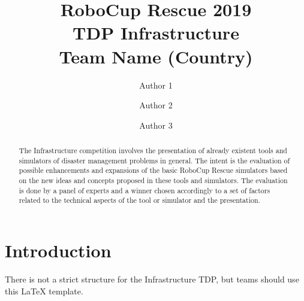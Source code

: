\documentclass[runningheads,a4paper]{llncs}
\begin{document}
\title{RoboCup Rescue 2019\\
       TDP Infrastructure\\
       Team Name (Country)}
\author{Author 1 \and Author 2 \and Author 3}
\maketitle
\begin{abstract}
The Infrastructure competition involves the presentation of already existent tools and simulators of disaster management problems in general. The intent is the evaluation of possible enhancements and expansions of the basic RoboCup Rescue simulators based on the new ideas and concepts proposed in these tools and simulators. The evaluation is done by a panel of experts and a winner chosen accordingly to a set of factors related to the technical aspects of the tool or simulator and the presentation.
\end{abstract}
\section{Introduction}
There is not a strict structure for the Infrastructure TDP, but teams should use this LaTeX template.


\end{document}
